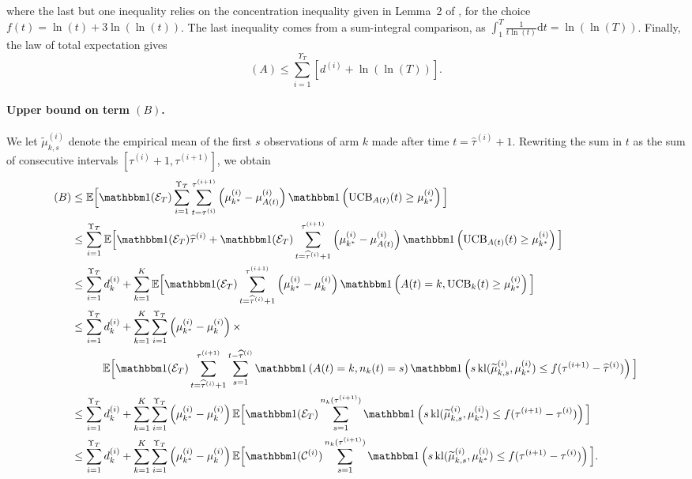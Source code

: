 %
where the last but one inequality relies on the concentration inequality given in Lemma~2 of \cite{KLUCBJournal}, for the choice $f(t) = \ln(t) + 3 \ln(\ln(t))$.
The last inequality comes from a sum-integral comparison, as $\int_{1}^T \frac{1}{t \ln(t)} \mathrm{d}t = \ln(\ln(T))$.
Finally, the law of total expectation gives
\begin{equation}\label{eq:6:TermAFinalGlobal}
    (A) \leq \sum_{i=1}^{\Upsilon_T}\left[d^{(i)} + \ln(\ln(T))\right].
\end{equation}

\paragraph{Upper bound on term $(B)$.}
%
We let $\widetilde{\mu}_{k,s}^{(i)}$ denote the empirical mean of the first $s$ observations of arm $k$ made after time $t=\widehat{\tau}^{(i)}+1$.
Rewriting the sum in $t$ as the sum of consecutive intervals $[\tau^{(i)}+1, \tau^{(i+1)}]$, we obtain
%
\begin{align*}
    (B) & \leq \bE\Big[\indic(\cE_T)\sum_{i=1}^{\Upsilon_T} \sum_{t=\tau^{(i)}}^{\tau^{(i+1)}}\left(\mu_{k^*}^{(i)} - \mu_{A(t)}^{(i)}\right)\indic\left(\UCB_{A(t)}(t) \geq \mu_{k^*}^{(i)}\right)\Big] \\
    & \leq \sum_{i=1}^{\Upsilon_T} \bE\Big[\indic(\cE_T)\widehat{\tau}^{(i)} + \indic(\cE_T) \sum_{t=\widehat{\tau}^{(i)}+1}^{\tau^{(i+1)}}\left(\mu_{k^*}^{(i)} - \mu_{A(t)}^{(i)}\right)\indic\left(\UCB_{A(t)}(t) \geq \mu_{k^*}^{(i)}\right)\Big] \\
    & \leq \sum_{i=1}^{\Upsilon_T} d_k^{(i)}+ \sum_{k=1}^K \bE\Big[\indic(\cE_T) \sum_{t=\widehat{\tau}^{(i)}+1}^{\tau^{(i+1)}}\left(\mu_{k^*}^{(i)} - \mu_k^{(i)}\right)\indic\left(A(t)=k,\UCB_k(t) \geq \mu_{k^*}^{(i)}\right)\Big] \\
    & \leq \sum_{i=1}^{\Upsilon_T} d_k^{(i)}+ \sum_{k=1}^K \sum_{i=1}^{\Upsilon_T} \left(\mu_{k^*}^{(i)} - \mu_k^{(i)}\right)\times \\
    &\hspace{1cm}\bE\Big[\indic(\cE_T) \sum_{t=\widehat{\tau}^{(i)}+1}^{\tau^{(i+1)}}\sum_{s=1}^{t-\widehat{\tau}^{(i)}}\indic\left(A(t) = k,n_k(t) = s\right) \indic\left(s \, \kl(\widetilde{\mu}_{k,s}^{(i)}, \mu_{k^*}^{(i)}) \leq f(\tau^{(i+1)} - \widehat{\tau}^{(i)})\right)\Big]
    \\
    & \leq \sum_{i=1}^{\Upsilon_T} d_k^{(i)}+ \sum_{k=1}^K \sum_{i=1}^{\Upsilon_T} \left(\mu_{k^*}^{(i)} - \mu_k^{(i)}\right)\bE\Big[\indic(\cE_T) \sum_{s=1}^{n_k(\tau^{(i+1)})}\indic\left(s \, \kl(\widetilde{\mu}_{k,s}^{(i)}, \mu_{k^*}^{(i)}) \leq f(\tau^{(i+1)} - \tau^{(i)})\right)\Big]  \\
    & \leq \sum_{i=1}^{\Upsilon_T} d_k^{(i)}+ \sum_{k=1}^K \sum_{i=1}^{\Upsilon_T} \left(\mu_{k^*}^{(i)} - \mu_k^{(i)}\right)\bE\Big[\indic(\cC^{(i)}) \sum_{s=1}^{n_k(\tau^{(i+1)})}\indic\left(s \, \kl(\widetilde{\mu}_{k,s}^{(i)}, \mu_{k^*}^{(i)}) \leq f(\tau^{(i+1)} - \tau^{(i)})\right)\Big].
\end{align*}

